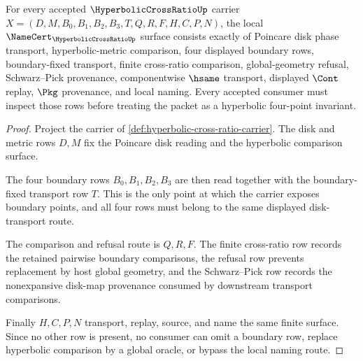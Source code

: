 \begin{theorem}
\label{thm:hyperbolic-cross-ratio-namecert-obligations}
For every accepted $\HyperbolicCrossRatioUp$ carrier $X=(D,M,B_0,B_1,B_2,B_3,T,Q,R,F,H,C,P,N)$, the local $\NameCert_{\HyperbolicCrossRatioUp}$ surface consists exactly of Poincare disk phase transport, hyperbolic-metric comparison, four displayed boundary rows, boundary-fixed transport, finite cross-ratio comparison, global-geometry refusal, Schwarz--Pick provenance, componentwise $\hsame$ transport, displayed $\Cont$ replay, $\Pkg$ provenance, and local naming. Every accepted consumer must inspect those rows before treating the packet as a hyperbolic four-point invariant.
\end{theorem}
\begin{proof}
Project the carrier of \autoref{def:hyperbolic-cross-ratio-carrier}. The disk and metric rows $D,M$ fix the Poincare disk reading and the hyperbolic comparison surface.

The four boundary rows $B_0,B_1,B_2,B_3$ are then read together with the boundary-fixed transport row $T$. This is the only point at which the carrier exposes boundary points, and all four rows must belong to the same displayed disk-transport route.

The comparison and refusal route is $Q,R,F$. The finite cross-ratio row records the retained pairwise boundary comparisons, the refusal row prevents replacement by host global geometry, and the Schwarz--Pick row records the nonexpansive disk-map provenance consumed by downstream transport comparisons.

Finally $H,C,P,N$ transport, replay, source, and name the same finite surface. Since no other row is present, no consumer can omit a boundary row, replace hyperbolic comparison by a global oracle, or bypass the local naming route.
\end{proof}

